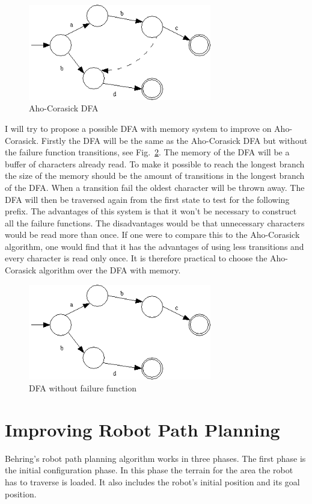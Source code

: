 \documentclass[a4paper,11pt,titlepage]{article}
\begin{document}
\begin{figure}[htbp]
   \centering
   \includegraphics[width=8cm]{aho.png}
   \caption{Aho-Corasick DFA}
   \label{Figure:aho}
\end{figure}

I will try to propose a possible DFA with memory system to improve on Aho-Corasick. Firstly the DFA will be the same as the Aho-Corasick DFA but without the failure function transitions, see Fig.~\ref{Figure:dfa-aho}. The memory of the DFA will be a buffer of characters already read. To make it possible to reach the longest branch the size of the memory should be the amount of transitions in the longest branch of the DFA. When a transition fail the oldest character will be thrown away. The DFA will then be traversed again from the first state to test for the following prefix.
The advantages of this system is that it won't be necessary to construct all the failure functions. The disadvantages would be that unnecessary characters would be read more than once. If one were to compare this to the Aho-Corasick algorithm, one would find that it has the advantages of using less transitions and every character is read only once. It is therefore  practical to choose the Aho-Corasick algorithm over the DFA with memory.

\begin{figure}[htbp]
   \centering
   \includegraphics[width=8cm]{dfa.png}
   \caption{DFA without failure function}
   \label{Figure:dfa-aho}
\end{figure}

\section{Improving Robot Path Planning}
Behring's robot path planning algorithm works in three phases. The first phase is the initial configuration phase. In this phase the terrain for the area the robot has to traverse is loaded. It also includes the robot's initial position and its goal position.
\end{document}
